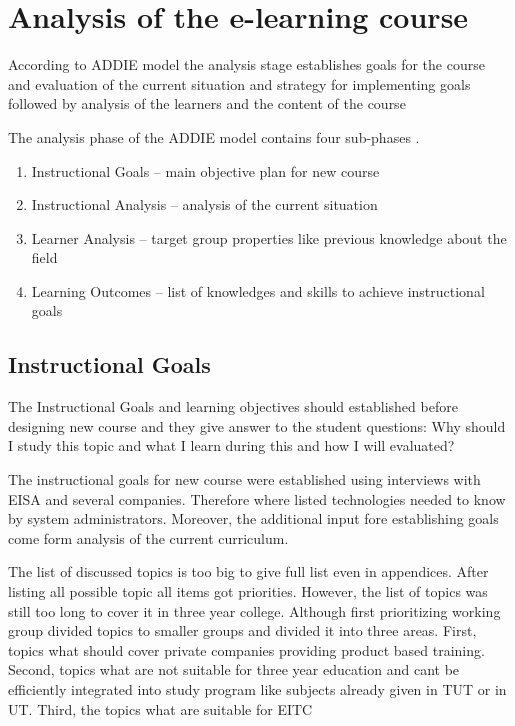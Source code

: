\section{Analysis of the e-learning course}
According to \gls{ADDIE} model the analysis stage establishes goals for the course and evaluation of the current situation and strategy for implementing goals followed by analysis of the learners and the content of the course \citep{website:addie}

The analysis phase of the \gls{ADDIE} model contains four sub-phases \citep{website:addie}.
\begin{enumerate}
\item Instructional Goals -- main objective plan for new course
\item Instructional Analysis -- analysis of the current situation
\item Learner Analysis -- target group properties like previous knowledge about the field
\item Learning Outcomes -- list of knowledges and skills to achieve instructional goals
\end{enumerate}


\subsection{Instructional Goals}
The Instructional Goals and learning objectives should established before designing new course and they give answer to the student questions: Why should I study this topic and what I learn during this and how I will evaluated? \citep{website:addie}


The instructional goals for new course were established using interviews with \gls{EISA} and several companies. Therefore where listed technologies needed to know by system administrators. Moreover, the additional input fore establishing goals come form analysis of the current curriculum.

The list of discussed topics is too big to give full list even in appendices. After listing all possible topic all items got priorities. However, the list of topics was still too long to cover it in three year college. Although first prioritizing working group divided topics to smaller groups and divided it into three areas. First, topics what should cover private companies providing product based training. Second, topics what are not suitable for three year education and cant be efficiently integrated into study program like subjects already given in \gls{TUT} or in \gls{UT}. Third, the topics what are suitable for \gls{EITC}


